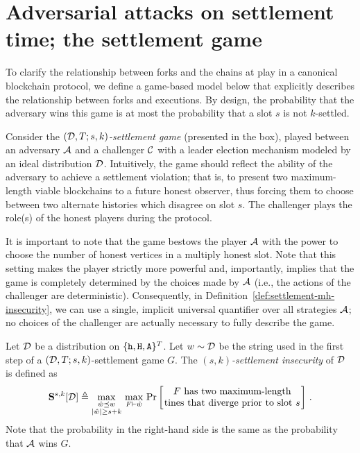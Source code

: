 \section[Attacks on Settlement]{Adversarial attacks on settlement time; the settlement game}\label{sec:game-mh} 


  To clarify the relationship between forks and the chains at play in a
  canonical blockchain protocol, we define a game-based model below that
  explicitly describes the relationship between forks and executions.
  By design, the probability that the adversary wins this game is at
  most the probability that a slot $s$ is not $k$-settled. 

  Consider the \emph{$(\mathcal{D},T;s,k)$-settlement game} 
  (presented in the box), played
  between an adversary $\mathcal{A}$ and a challenger $\mathcal{C}$ with
  a leader election mechanism modeled by an ideal distribution
  $\mathcal{D}$. Intuitively, the game should reflect the ability of
  the adversary to achieve a settlement violation; that is, to present
  two maximum-length viable blockchains to a future honest observer,
  thus forcing them to choose between two alternate histories which
  disagree on slot $s$.
  The challenger plays the role(s) of the honest players during the
  protocol. 

  It is important to note that the game bestows the player $\mathcal{A}$ 
  with the power to choose the number of honest vertices in 
  a multiply honest slot. 
  Note that this setting makes the player strictly more powerful and, 
  importantly, implies that 
  the game is completely determined 
  by the choices made by $\mathcal{A}$ 
  (i.e., the actions of the challenger are deterministic). 
  Consequently, in Definition~\ref{def:settlement-mh-insecurity}, 
  we can use a single, implicit universal quantifier 
  over all strategies $\mathcal{A}$; no choices of the challenger are actually necessary to fully describe the game.


  \begin{definition}\label{def:settlement-mh-insecurity}
    Let $\mathcal{D}$ be a distribution on $\{\mathtt{h}, \mathtt{H}, \mathtt{A}\}^T$. 
    Let $w \sim \mathcal{D}$ be the string used in the 
    first step of a $(\mathcal{D}, T; s, k)$-settlement game $G$. 
    The \emph{$(s,k)$-settlement insecurity} of $\mathcal{D}$ 
    is defined as 
    \[
      \mathbf{S}^{s,k}[\Distribution] \triangleq 
        \max_{\substack{\hat{w} \PrefixEq w \\ |\hat{w}| \geq s + k}}\,
        \max_{F \Fork \hat{w}}\, 
        \Pr\left[\parbox{50mm}{\centering $F$ has two maximum-length tines that diverge prior to slot $s$}\right]
      \,.
    \]
    Note that the probability in the right-hand side is the same as 
    the probability that $\mathcal{A}$ wins $G$.
  \end{definition}

